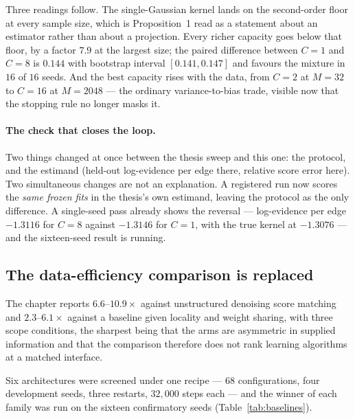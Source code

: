 \documentclass[11pt,a4paper]{article}
\begin{document}
Three readings follow. The single-Gaussian kernel lands on the second-order floor at every sample
size, which is Proposition~1 read as a statement about an estimator rather than about a
projection. Every richer capacity goes below that floor, by a factor $7.9$ at the largest size; the
paired difference between $C=1$ and $C=8$ is $0.144$ with bootstrap interval $[0.141,0.147]$ and
favours the mixture in $16$ of $16$ seeds. And the best capacity rises with the data, from $C=2$ at
$M=32$ to $C=16$ at $M=2048$ --- the ordinary variance-to-bias trade, visible now that the stopping
rule no longer masks it.

\paragraph{The check that closes the loop.}
Two things changed at once between the thesis sweep and this one: the protocol, and the estimand
(held-out log-evidence per edge there, relative score error here). Two simultaneous changes are not
an explanation. A registered run now scores the \emph{same frozen fits} in the thesis's own
estimand, leaving the protocol as the only difference. A single-seed pass already shows the
reversal --- log-evidence per edge $-1.3116$ for $C=8$ against $-1.3146$ for $C=1$, with the true
kernel at $-1.3076$ --- and the sixteen-seed result is running.

\subsection{The data-efficiency comparison is replaced}

The chapter reports $6.6$--$10.9\times$ against unstructured denoising score matching and
$2.3$--$6.1\times$ against a baseline given locality and weight sharing, with three scope
conditions, the sharpest being that the arms are asymmetric in supplied information and that the
comparison therefore does not rank learning algorithms at a matched interface.

Six architectures were screened under one recipe --- $68$ configurations, four development seeds,
three restarts, $32{,}000$ steps each --- and the winner of each family was run on the sixteen
confirmatory seeds (Table~\ref{tab:baselines}).
\end{document}
